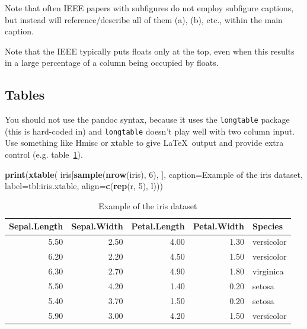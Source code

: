 \documentclass[a4paper,conference]{IEEEtran}
\newenvironment{Shaded}{\begin{snugshade}}{\end{snugshade}}
\newcommand{\AttributeTok}[1]{\textcolor[rgb]{0.13,0.29,0.53}{#1}}
\newcommand{\DecValTok}[1]{\textcolor[rgb]{0.00,0.00,0.81}{#1}}
\newcommand{\FunctionTok}[1]{\textcolor[rgb]{0.13,0.29,0.53}{\textbf{#1}}}
\newcommand{\NormalTok}[1]{#1}
\newcommand{\StringTok}[1]{\textcolor[rgb]{0.31,0.60,0.02}{#1}}
\begin{document}
Note that often IEEE papers with subfigures do not employ subfigure
captions, but instead will reference/describe all of them (a), (b),
etc., within the main caption.

Note that the IEEE typically puts floats only at the top, even when this
results in a large percentage of a column being occupied by floats.

\hypertarget{sec:tables}{%
\subsection{Tables}\label{sec:tables}}

You should not use the pandoc syntax, because it uses the
\texttt{longtable} package (this is hard-coded in) and
\texttt{longtable} doesn't play well with two column input. Use
something like Hmisc or xtable to give \LaTeX~output and provide extra
control (e.g. table~\ref{tbl:iris.xtable}).

\begin{Shaded}
\begin{Highlighting}[]
\FunctionTok{print}\NormalTok{(}\FunctionTok{xtable}\NormalTok{(}
\NormalTok{  iris[}\FunctionTok{sample}\NormalTok{(}\FunctionTok{nrow}\NormalTok{(iris), }\DecValTok{6}\NormalTok{), ],}
  \AttributeTok{caption=}\StringTok{\textquotesingle{}Example of the iris dataset\textquotesingle{}}\NormalTok{,}
  \AttributeTok{label=}\StringTok{\textquotesingle{}tbl:iris.xtable\textquotesingle{}}\NormalTok{,}
  \AttributeTok{align=}\FunctionTok{c}\NormalTok{(}\FunctionTok{rep}\NormalTok{(}\StringTok{\textquotesingle{}r\textquotesingle{}}\NormalTok{, }\DecValTok{5}\NormalTok{), }\StringTok{\textquotesingle{}l\textquotesingle{}}\NormalTok{)))}
\end{Highlighting}
\end{Shaded}

\begin{table}[!t]
\centering
\caption{Example of the iris dataset} 
\label{tbl:iris.xtable}
\begin{tabular}{rrrrl}
  \hline
Sepal.Length & Sepal.Width & Petal.Length & Petal.Width & Species \\ 
  \hline
5.50 & 2.50 & 4.00 & 1.30 & versicolor \\ 
  6.20 & 2.20 & 4.50 & 1.50 & versicolor \\ 
  6.30 & 2.70 & 4.90 & 1.80 & virginica \\ 
  5.50 & 4.20 & 1.40 & 0.20 & setosa \\ 
  5.40 & 3.70 & 1.50 & 0.20 & setosa \\ 
  5.90 & 3.00 & 4.20 & 1.50 & versicolor \\ 
   \hline
\end{tabular}
\end{table}
\end{document}
